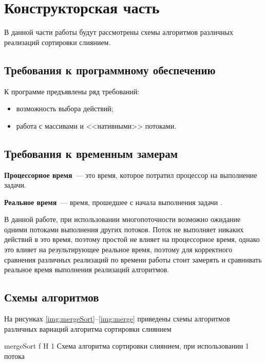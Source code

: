 \chapter{Конструкторская часть}
В данной части работы будут рассмотрены схемы алгоритмов различных реализаций сортировки слиянием.

\section{Требования к программному обеспечению}

К программе предъявлены ряд требований:

\begin{itemize}
	\item возможность выбора действий;
	\item работа с массивами и <<нативными>> потоками.
\end{itemize}

\section{Требования к временным замерам}
\textbf{Процессорное время}~--- это время, которое потратил процессор  на выполнение задачи.

\textbf{Реальное время}~--- время, прошедшее с начала выполнения задачи \cite{time}. 

В данной работе, при использовании многопоточности возможно
ожидание одними потоками выполнения других потоков. Поток не выполняет
никаких действий в это время, поэтому простой не влияет на процессорное время, однако это влияет на результирующее реальное время, поэтому для корректного сравнения различных реализаций  по времени работы стоит замерять и сравнивать реальное время
выполнения реализаций алгоритмов.

\section{Схемы алгоритмов}

На рисунках \ref{img:mergeSort}--\ref{img:merge} приведены схемы алгоритмов различных вариаций алгоритма сортировки слиянием

{mergeSort} %
{f} %
{H} %
{1\textwidth} %
{Схема алгоритма сортировки слиянием, при использовании 1 потока} %

